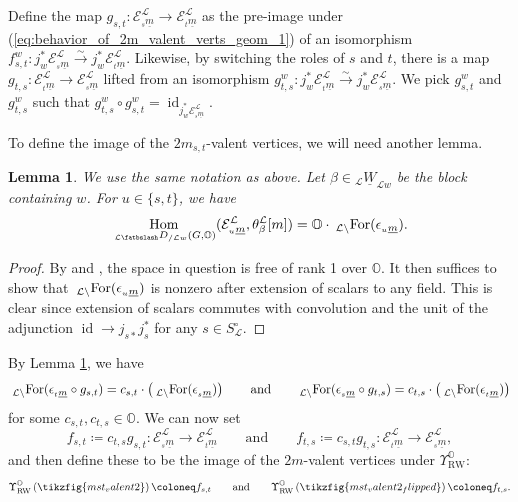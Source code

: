 \documentclass{amsart}
\renewcommand{\O}{\mathbb{O}}
\newcommand{\scrE}{\mathcal{E}}
\newcommand{\scrL}{\mathcal{L}}
\DeclareMathOperator{\Hom}{Hom}
\DeclareMathOperator{\id}{id}
\DeclareMathOperator{\RW}{RW}
\newcommand{\DME}[2]{\:_{#1 \smallleftdash} D_{/ #2} }
\newcommand{\ForME}[1]{\:_{#1 \backslash} \textnormal{For}}
\newcommand{\uW}[2]{{}_{#1}\underline{W}_{#2}}
\newcommand{\bfslash}{\mathbin{\fatbslash}}
\newcommand*\smallleftdash{\bfslash}
\newtheorem{lemma}[subsubsection]{Lemma}
\theoremstyle{definition}
\numberwithin{equation}{subsection}
\begin{document}
Define the map $g_{s,t} : \scrE_{{}_s \underline{m}}^{\scrL} \to \scrE_{{}_t \underline{m}}^{\scrL}$ as the pre-image under (\ref{eq:behavior_of_2m_valent_verts_geom_1}) of an isomorphism $f_{s,t}^w :j_w^* \scrE_{{}_s \underline{m}}^{\scrL} \stackrel{\sim}{\to} j_w^* \scrE_{{}_t \underline{m}}^{\scrL}$.
Likewise, by switching the roles of $s$ and $t$, there is a map $g_{t,s} : \scrE_{{}_t \underline{m}}^{\scrL} \to \scrE_{{}_s \underline{m}}^{\scrL}$ lifted from an isomorphism $g_{t,s}^w :j_w^* \scrE_{{}_t \underline{m}}^{\scrL} \stackrel{\sim}{\to} j_w^* \scrE_{{}_s \underline{m}}^{\scrL}$. 
We pick $g_{s,t}^w$ and $g_{t,s}^w$ such that $g_{t,s}^w \circ g_{s,t}^w = \id_{j_w^* \scrE_{{}_s \underline{m}}^{\scrL}}$.

To define the image of the $2m_{s,t}$-valent vertices, we will need another lemma. 

\begin{lemma}\label{lem:hom_generated_by_counit_soergel}
  We use the same notation as above. Let $\beta \in \uW{\scrL}{\scrL w}$ be the block containing $w$. For $u \in \{s,t\}$, we have
  \[\Hom_{\DME{\scrL}{\scrL w} (G, \O)} (\scrE_{{}_u \underline{m}}^{\scrL}, \theta_{\beta}^{\scrL} [m]) = \O \cdot \ForME{\scrL} (\epsilon_{{}_u \underline{m}}).\]
\end{lemma}
\begin{proof}
    By \cite[Lemma 3.6.5]{Sandvik} and \cite[Proposition 3.8.13]{Sandvik}, the space in question is free of rank 1 over $\O$.
    It then suffices to show that $\ForME{\scrL} (\epsilon_{{}_u \underline{m}})$ is nonzero after extension of scalars to any field. This is clear since extension of scalars commutes with convolution and the unit of the adjunction $\id \to j_{s*} j_s^*$ for any $s \in S_{\scrL}^{\circ}$.
\end{proof}

By Lemma \ref{lem:hom_generated_by_counit_soergel}, we have 
\begin{equation}\label{eq:cst_constants_soergel}
  \ForME{\scrL} (\epsilon_{{}_t \underline{m}} \circ g_{s,t}) = c_{s,t} \cdot \left( \ForME{\scrL} (\epsilon_{{}_s \underline{m}})\right) \qquad\text{and}\qquad \ForME{\scrL} (\epsilon_{{}_s \underline{m}} \circ g_{t,s}) = c_{t,s} \cdot \left( \ForME{\scrL} (\epsilon_{{}_t \underline{m}}) \right)
\end{equation}
for some $c_{s,t}, c_{t,s} \in \O$. We can now set
\[f_{s,t} \coloneq c_{t,s} g_{s,t} : \scrE_{{}_s \underline{m}}^{\scrL} \to \scrE_{{}_t \underline{m}}^{\scrL} \qquad\text{and}\qquad f_{t,s} \coloneq c_{s,t} g_{t,s} : \scrE_{{}_t \underline{m}}^{\scrL} \to \scrE_{{}_s \underline{m}}^{\scrL},\]
and then define these to be the image of the $2m$-valent vertices under $\Upsilon_{\RW}^{\O}$:
\[\Upsilon_{\RW}^{\O} \left( \tikzfig{mst_valent2}\right) \coloneq f_{s,t} \qquad\text{and}\qquad\Upsilon_{\RW}^{\O} \left( \tikzfig{mst_valent2_flipped}\right) \coloneq f_{t,s}.\]
 
\end{document}

